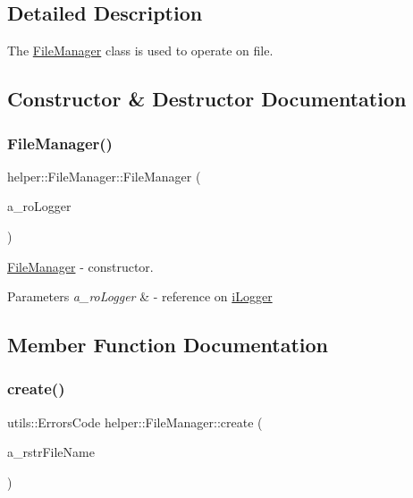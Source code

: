 \subsection{Detailed Description}
The \mbox{\hyperlink{classhelper_1_1_file_manager}{File\+Manager}} class is used to operate on file. 

\subsection{Constructor \& Destructor Documentation}
\mbox{\label{classhelper_1_1_file_manager_ad4d27bd875ae06a87736bd04cab9539b}} 
\subsubsection{\texorpdfstring{FileManager()}{FileManager()}}
{\footnotesize\ttfamily helper\+::\+File\+Manager\+::\+File\+Manager (\begin{DoxyParamCaption}\item[{const \mbox{\hyperlink{classi_logger}{i\+Logger}} \&}]{a\+\_\+ro\+Logger }\end{DoxyParamCaption})\hspace{0.3cm}{\ttfamily [explicit]}}



\mbox{\hyperlink{classhelper_1_1_file_manager}{File\+Manager}} -\/ constructor. 


\begin{DoxyParams}{Parameters}
{\em a\+\_\+ro\+Logger} & -\/ reference on \mbox{\hyperlink{classi_logger}{i\+Logger}} \\
\hline
\end{DoxyParams}


\subsection{Member Function Documentation}
\mbox{\label{classhelper_1_1_file_manager_ab36cf64cb374f9d4f72d7490c18f9891}} 
\subsubsection{\texorpdfstring{create()}{create()}}
{\footnotesize\ttfamily utils\+::\+Errors\+Code helper\+::\+File\+Manager\+::create (\begin{DoxyParamCaption}\item[{const std\+::string \&}]{a\+\_\+rstr\+File\+Name }\end{DoxyParamCaption})\hspace{0.3cm}{\ttfamily [virtual]}}



